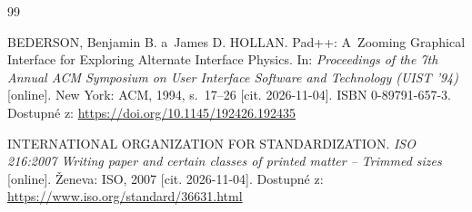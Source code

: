 \documentclass[12pt, a4paper, oneside]{article}
\begin{document}
\begingroup
\sloppy
\renewcommand{\section}[2]{}%
\begin{thebibliography}{99}

    BEDERSON, Benjamin B. a~James D. HOLLAN. Pad++: A~Zooming Graphical Interface for Exploring Alternate Interface Physics. In: \textit{Proceedings of the 7th Annual ACM Symposium on User Interface Software and Technology (UIST '94)} [online]. New York: ACM, 1994, s.~17--26 [cit. 2026-11-04]. ISBN 0-89791-657-3. Dostupné z: \url{https://doi.org/10.1145/192426.192435}

    INTERNATIONAL ORGANIZATION FOR STANDARDIZATION. \textit{ISO 216:2007 Writing paper and certain classes of printed matter -- Trimmed sizes} [online]. Ženeva: ISO, 2007 [cit. 2026-11-04]. Dostupné z: \url{https://www.iso.org/standard/36631.html}

\end{thebibliography}
\endgroup


\clearpage
\section*{Přílohy}
\end{document}
